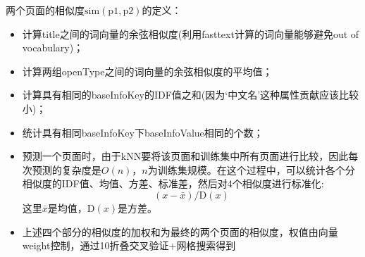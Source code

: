 两个页面的相似度$\mathrm{sim(p1,p2)}$的定义：
\begin{itemize}
	\item 计算\textrm{title}之间的词向量的余弦相似度(利用\textrm{fasttext}计算的词向量能够避免out of vocabulary)；
	\item 计算两组\textrm{openType}之间的词向量的余弦相似度的平均值；
	\item 计算具有相同的\textrm{baseInfoKey}的\textrm{IDF}值之和(因为‘中文名’这种属性贡献应该比较小)；
	\item 统计具有相同\textrm{baseInfoKey}下\textrm{baseInfoValue}相同的个数；
	\item 预测一个页面时，由于\textrm{kNN}要将该页面和训练集中所有页面进行比较，因此每次预测的复杂度是$O(n)$，$n$为训练集规模。在这个过程中，可以统计各个分相似度的\textrm{IDF}值、均值、方差、标准差，然后对4个相似度进行标准化:
		\begin{displaymath}
			(x-\bar{x})/\mathrm{D}(x)
		\end{displaymath}
		这里$\bar{x}$是均值，$\mathrm{D}(x)$是方差。
	\item 上述四个部分的相似度的加权和为最终的两个页面的相似度，权值由向量\textrm{weight}控制，通过10折叠交叉验证$+$网格搜索得到
\end{itemize}

